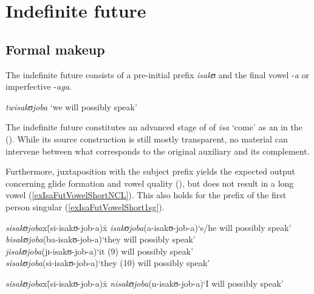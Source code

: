 \section{Indefinite future}\label{isaFut}
\subsection{Formal makeup}
The indefinite future consists of a pre-initial prefix \textit{isakʊ} and the final vowel -\textit{a} or imperfective -\textit{aga}.

\begin{exe}
\ex \textit{twisakʊjoba} \lq we will possibly speak'
\end{exe}

The indefinite future constitutes an advanced stage of  of \textit{isa} \lq come' as an  in the  (). While its source construction is still mostly transparent, no material can intervene between what corresponds to the original auxiliary and its  complement. 

\begin{exe}
\ex \begin{xlist}
\end{xlist}
\end{exe}

Furthermore, juxtaposition with the subject prefix yields the expected output concerning glide formation and vowel quality (), but does not result in a long vowel (\ref{exIsaFutVowelShortNCL}). This also holds for the prefix of the first person singular (\ref{exIsaFutVowelShort1sg}).
\begin{exe}
\ex \label{exIsaFutVowelShortNCL}\begin{tabbing}
\textit{sisakʊjoba}x\=(\degree si-isakʊ-job-a)x\=\kill%
\textit{isakʊjoba}\>(\degree a-isakʊ-job-a)\>`s/he will possibly speak'\\ 
\textit{bisakʊjoba}\>(\degree ba-isakʊ-job-a)\>`they will possibly speak'\\
\textit{jisakʊjoba}\>(\degree jɪ-isakʊ-job-a)\>`it (9) will possibly speak'\\ 
\textit{sisakʊjoba}\>(\degree si-isakʊ-job-a)\>`they (10) will possibly speak'
\end{tabbing} 
\ex\label{exIsaFutVowelShort1sg}
\begin{tabbing}
\textit{sisakʊjoba}x\=(\degree si-isakʊ-job-a)x\=\kill%
\textit{nisakʊjoba}\>(\degree n-isakʊ-job-a)\>`I will possibly speak'
\end{tabbing}
\end{exe}

